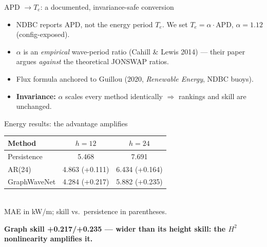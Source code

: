 \documentclass[aspectratio=169]{beamer}
\newcommand{\take}[1]{\vspace{0.6ex}\begin{center}\textbf{\color{colgraph}#1}\end{center}}
\begin{document}
\begin{frame}{APD $\rightarrow T_e$: a documented, invariance-safe conversion}
  \begin{itemize}
    \item NDBC reports APD, not the energy period $T_e$. We set $T_e=\alpha\cdot\text{APD}$, $\alpha=1.12$ (config-exposed).
    \item $\alpha$ is an \emph{empirical} wave-period ratio (Cahill \& Lewis 2014) --- their paper argues \emph{against} the theoretical JONSWAP ratios.
    \item Flux formula anchored to Guillou (2020, \emph{Renewable Energy}, NDBC buoys).
    \item \textbf{Invariance:} $\alpha$ scales every method identically $\Rightarrow$ rankings and skill are unchanged.
  \end{itemize}
\end{frame}

\begin{frame}{Energy results: the advantage amplifies}
  \begin{center}
  \begin{tabular}{l cc}
    \toprule
    Method & $h{=}12$ & $h{=}24$\\
    \midrule
\textcolor{coltemporal}{Persistence} & 5.468 & 7.691 \\
\textcolor{coltemporal}{AR(24)} & 4.863 (+0.111) & 6.434 (+0.164) \\
\textcolor{colgraph}{GraphWaveNet} & 4.284 (+0.217) & 5.882 (+0.235) \\
    \bottomrule
  \end{tabular}\\[0.5ex]
  {\footnotesize MAE in kW/m; skill vs.\ persistence in parentheses.}
  \end{center}
  \take{Graph skill +0.217/+0.235 --- wider than its height skill: the $H^2$ nonlinearity amplifies it.}
\end{frame}
\end{document}
